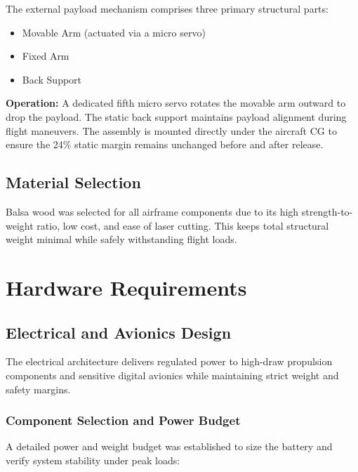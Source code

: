 \documentclass[11pt,a4paper]{article}
\begin{document}
The external payload mechanism comprises three primary structural parts:
\begin{itemize}
    \item Movable Arm (actuated via a micro servo)
    \item Fixed Arm
    \item Back Support
\end{itemize}

\textbf{Operation:} A dedicated fifth micro servo rotates the movable arm outward to drop the payload. The static back support maintains payload alignment during flight maneuvers. The assembly is mounted directly under the aircraft CG to ensure the 24\% static margin remains unchanged before and after release.

\subsection{Material Selection}
Balsa wood was selected for all airframe components due to its high strength-to-weight ratio, low cost, and ease of laser cutting. This keeps total structural weight minimal while safely withstanding flight loads.


\section{Hardware Requirements}

\subsection{Electrical and Avionics Design}
The electrical architecture delivers regulated power to high-draw propulsion components and sensitive digital avionics while maintaining strict weight and safety margins.

\subsubsection{Component Selection and Power Budget}
A detailed power and weight budget was established to size the battery and verify system stability under peak loads:
\end{document}
